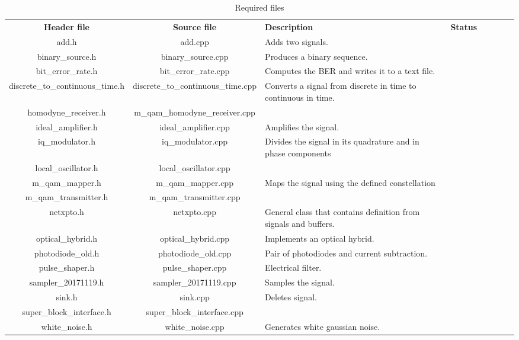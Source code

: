 \begin{table}[]
 	\centering
 	\caption{Required files}
 	\begin{tabular}{|c|c|p{40mm}|c|ccp{40mm}c}
 		\cline{1-4}
 		\textbf{Header file} & \textbf{Source file} & \textbf{Description} &  \textbf{Status} & \\ \cline{1-4}
 		add.h & add.cpp & Adds two signals.  & \checkmark &   \\ \cline{1-4}
 		binary\_source.h & binary\_source.cpp & Produces a binary sequence. & \checkmark & \\ \cline{1-4}
 		bit\_error\_rate.h & bit\_error\_rate.cpp & Computes the BER and writes it to a text file. & \checkmark & \\ \cline{1-4}
 		discrete\_to\_continuous\_time.h & discrete\_to\_continuous\_time.cpp & Converts a signal from discrete in time to continuous in time. & \checkmark & \\ \cline{1-4}
 		homodyne\_receiver.h & m\_qam\_homodyne\_receiver.cpp & & \\ \cline{1-4}
 		ideal\_amplifier.h & ideal\_amplifier.cpp & Amplifies the signal. & \checkmark & \\ \cline{1-4}
 		iq\_modulator.h & iq\_modulator.cpp & Divides the signal in its quadrature and in phase components & \checkmark &\\ \cline{1-4}
 		local\_oscillator.h & local\_oscillator.cpp & & & \checkmark &\\ \cline{1-4}
 		m\_qam\_mapper.h & m\_qam\_mapper.cpp & Maps the signal using the defined constellation & \checkmark & \\ \cline{1-4}
 		m\_qam\_transmitter.h & m\_qam\_transmitter.cpp & & \checkmark & \\ \cline{1-4}
 		netxpto.h & netxpto.cpp & General class that contains definition from signals and buffers. & \checkmark &\\ \cline{1-4}
 		optical\_hybrid.h & optical\_hybrid.cpp & Implements an optical hybrid. & \checkmark & \\ \cline{1-4}
 		photodiode\_old.h & photodiode\_old.cpp & Pair of photodiodes and current subtraction. & \checkmark & \\ \cline{1-4}
 		pulse\_shaper.h & pulse\_shaper.cpp & Electrical filter. & \checkmark &\\ \cline{1-4}
 		sampler\_20171119.h & sampler\_20171119.cpp & Samples the signal. & \checkmark &\\ \cline{1-4}
 		sink.h & sink.cpp & Deletes signal. & \checkmark & \\ \cline{1-4}
 		super\_block\_interface.h & super\_block\_interface.cpp & & \checkmark &\\ \cline{1-4}
 		white\_noise.h & white\_noise.cpp & Generates white gaussian noise. & \checkmark &\\ \cline{1-4}  
 	\end{tabular}
 	\label{table:files}
\end{table}

